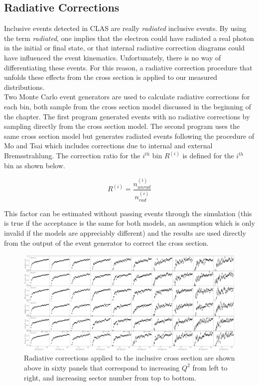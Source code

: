 \subsection{Radiative Corrections}

Inclusive events detected in CLAS are really \textit{radiated} inclusive events.  By using the term \textit{radiated}, one implies that the electron could have radiated a real photon in the initial or final state, or that internal radiative correction diagrams could have influenced the event kinematics.  Unfortunately, there is no way of differentiating these events.  For this reason, a radiative correction procedure that unfolds these effects from the cross section is applied to our measured distributions.  \\

Two Monte Carlo event generators are used to calculate radiative corrections for each bin, both sample from the cross section model discussed in the beginning of the chapter.  The first program generated events with no radiative corrections by sampling directly from the cross section model.  The second program uses the same cross section model but generates radiated events following the procedure of Mo and Tsai \cite{misc-mo:1969} which includes corrections due to internal and external Bremsstrahlung.  The correction ratio for the $i^{th}$ bin $R^{(i)}$ is defined for the $i^{th}$ bin as shown below. 

\begin{equation}
  R^{(i)} = \frac{n_{unrad}^{(i)}}{n_{rad}^{(i)}}
\end{equation}

This factor can be estimated without passing events through the simulation (this is true if the acceptance is the same for both models, an assumption which is only invalid if the models are appreciably different) and the results are used directly from the output of the event generator to correct the cross section.  

\begin{figure}
	\centering
	\label{fig-rad-corr-grid} 
	\includegraphics[width=\textwidth]{image/plots/inclusive/rad_corr_grid.pdf}
	\caption{Radiative corrections applied to the inclusive cross section are shown above in sixty panels that correspond to increasing $Q^2$ from left to right, and increasing sector number from top to bottom.  }
\end{figure}

